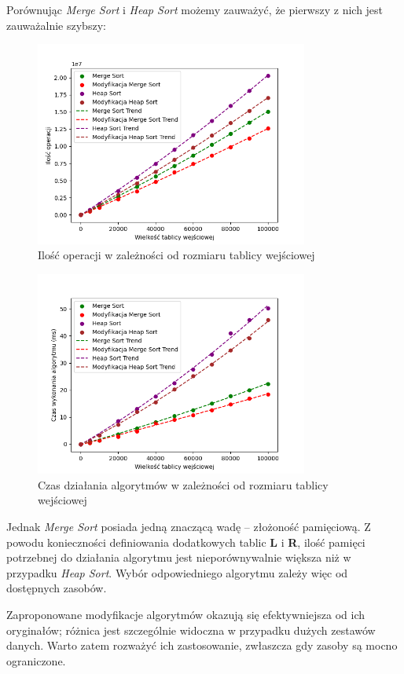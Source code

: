 \documentclass{article}
\begin{document}
Porównując \textit{Merge Sort} i \textit{Heap Sort} możemy zauważyć, że pierwszy z nich jest zauważalnie szybszy:
\begin{figure}[H]
    \centering
    \includegraphics[width=0.8\textwidth]{Figure_4.png}
    \caption{Ilość operacji w zależności od rozmiaru tablicy wejściowej}
    \label{fig:heapmerge}
\end{figure}
\begin{figure}[H]
    \centering
    \includegraphics[width=0.8\textwidth]{Figure_8.png}
    \caption{Czas działania algorytmów w zależności od rozmiaru tablicy wejściowej}
    \label{fig:heapmerget}
\end{figure}
Jednak \textit{Merge Sort} posiada jedną znaczącą wadę – złożoność pamięciową. Z powodu konieczności definiowania dodatkowych tablic \textbf{L} i \textbf{R}, ilość pamięci potrzebnej do działania algorytmu jest nieporównywalnie większa niż w przypadku \textit{Heap Sort}. Wybór odpowiedniego algorytmu zależy więc od dostępnych zasobów.

Zaproponowane modyfikacje algorytmów okazują się efektywniejsza od ich oryginałów; różnica jest szczególnie widoczna w przypadku dużych zestawów danych. Warto zatem rozważyć ich zastosowanie, zwłaszcza gdy zasoby są mocno ograniczone.
\end{document}
